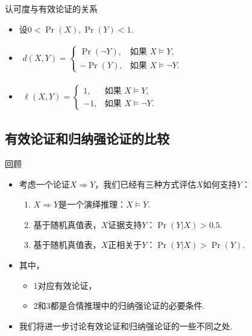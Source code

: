 {认可度与有效论证的关系}
\begin{itemize}
    \item 设$0< \Pr(X),\Pr(Y) < 1$.
    \item 
    $\begin{aligned}
        d(X, Y) =
        \begin{cases}
            \Pr(\lnot Y),& \text{如果 } X \models Y, \\
            -\Pr(Y),& \text{如果 } X \models \lnot Y.
        \end{cases}
    \end{aligned}$
    \item 
    $\begin{aligned}
        \ell(X, Y) = 
        \begin{cases}
            1,& \text{如果 } X \models Y, \\
            -1,& \text{如果 } X \models \lnot Y.
        \end{cases}
    \end{aligned}$
\end{itemize}


\subsection{有效论证和归纳强论证的比较}



    {回顾}
\begin{itemize}
    \item     考虑一个论证$X\Rightarrow Y$，我们已经有三种方式评估$X$如何支持$Y$：
    \begin{enumerate}
        \item $X\Rightarrow Y$是一个演绎推理：$X\models Y$.
        \item 基于随机真值表，$X$证据支持$Y$：$\Pr(Y|X) > 0.5$.
        \item 基于随机真值表，$X$正相关于$Y$：$\Pr(Y|X) > \Pr(Y)$.
    \end{enumerate}
    \item 其中，
    \begin{itemize}
        \item 1对应有效论证，
        \item 2和3都是合情推理中的归纳强论证的必要条件.
    \end{itemize}
    \item 我们将进一步讨论有效论证和归纳强论证的一些不同之处.
\end{itemize}


